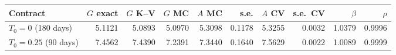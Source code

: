 \begin{tabular}{lrrrrrrrrr}
\toprule
Contract & $G$ exact & $G$ K--V & $G$ MC & $A$ MC & s.e. & $A$ CV & s.e.\ CV & $\beta$ & $\rho$ \\
\midrule
$T_0=0$ (180 days) & 5.1121 & 5.0893 & 5.0970 & 5.3098 & 0.1178 & 5.3255 & 0.0032 & 1.0379 & 0.9996 \\
$T_0=0.25$ (90 days) & 7.4562 & 7.4390 & 7.2391 & 7.3440 & 0.1640 & 7.5629 & 0.0022 & 1.0089 & 0.9999 \\
\bottomrule
\end{tabular}
